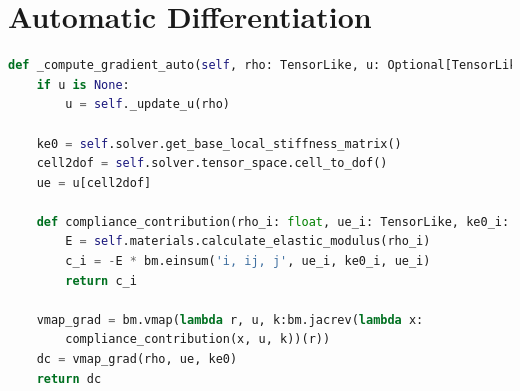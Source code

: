 \documentclass[mathpazo]{cicp}
\begin{document}
\section{Automatic Differentiation}
\label{sec:ad_compliance}
\begin{lstlisting}[language=python]
def _compute_gradient_auto(self, rho: TensorLike, u: Optional[TensorLike] = None) -> TensorLike:
	if u is None:
		u = self._update_u(rho)
	
	ke0 = self.solver.get_base_local_stiffness_matrix()
	cell2dof = self.solver.tensor_space.cell_to_dof()
	ue = u[cell2dof] 
	
	def compliance_contribution(rho_i: float, ue_i: TensorLike, ke0_i: TensorLike) -> float:
		E = self.materials.calculate_elastic_modulus(rho_i)
		c_i = -E * bm.einsum('i, ij, j', ue_i, ke0_i, ue_i)
		return c_i
	
	vmap_grad = bm.vmap(lambda r, u, k:bm.jacrev(lambda x: 
		compliance_contribution(x, u, k))(r))
	dc = vmap_grad(rho, ue, ke0)
	return dc
\end{lstlisting}






\end{document}

